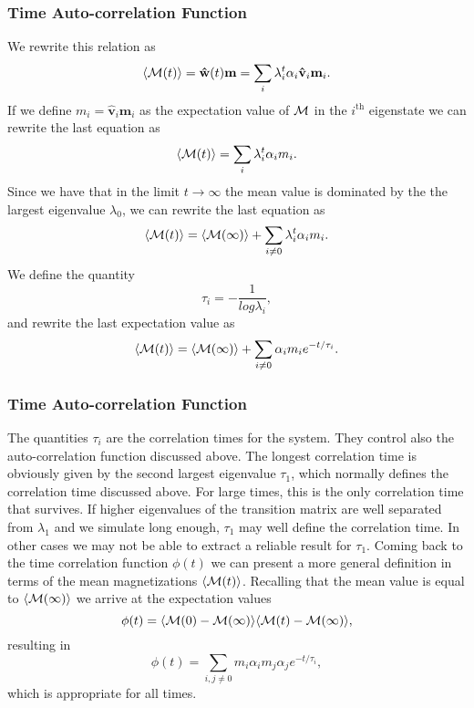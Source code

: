 \documentclass{beamer}
\begin{document}
\begin{frame}
\frametitle{Time Auto-correlation Function}

\begin{block}{}
We rewrite this relation  as
 \[
 \langle {\cal M}(t) \rangle  = \mathbf{\hat{w}}(t)\mathbf{m}=\sum_i\lambda_i^t\alpha_i\mathbf{\hat{v}}_i\mathbf{m}_i.
\] 
If we define $m_i=\mathbf{\hat{v}}_i\mathbf{m}_i$ as the expectation value of
${\cal M}$ in the $i^{\mathrm{th}}$ eigenstate we can rewrite the last equation as
 \[
 \langle {\cal M}(t) \rangle  = \sum_i\lambda_i^t\alpha_im_i.
\] 
Since we have that in the limit $t\rightarrow \infty$ the mean value is dominated by the 
the largest eigenvalue $\lambda_0$, we can rewrite the last equation as
 \[
 \langle {\cal M}(t) \rangle  = \langle {\cal M}(\infty) \rangle+\sum_{i\ne 0}\lambda_i^t\alpha_im_i.
\] 
We define the quantity
\[
   \tau_i=-\frac{1}{log\lambda_i},
\]
and rewrite the last expectation value as
 \[
 \langle {\cal M}(t) \rangle  = \langle {\cal M}(\infty) \rangle+\sum_{i\ne 0}\alpha_im_ie^{-t/\tau_i}.
\label{eq:finalmeanm}
\] 
\end{block}
\end{frame}

\begin{frame}
\frametitle{Time Auto-correlation Function}

\begin{block}{}

The quantities $\tau_i$ are the correlation times for the system. They control also the auto-correlation function 
discussed above.  The longest correlation time is obviously given by the second largest
eigenvalue $\tau_1$, which normally defines the correlation time discussed above. For large times, this is the 
only correlation time that survives. If higher eigenvalues of the transition matrix are well separated from 
$\lambda_1$ and we simulate long enough,  $\tau_1$ may well define the correlation time. 
In other cases we may not be able to extract a reliable result for $\tau_1$. 
Coming back to the time correlation function $\phi(t)$ we can present a more general definition in terms
of the mean magnetizations $ \langle {\cal M}(t) \rangle$. Recalling that the mean value is equal 
to $ \langle {\cal M}(\infty) \rangle$ we arrive at the expectation values
\[
\phi(t) =\langle {\cal M}(0)-{\cal M}(\infty)\rangle \langle {\cal M}(t)-{\cal M}(\infty)\rangle,
\]
resulting in
\[
\phi(t) =\sum_{i,j\ne 0}m_i\alpha_im_j\alpha_je^{-t/\tau_i},
\]
which is appropriate for all times.
\end{block}
\end{frame}
\end{document}
